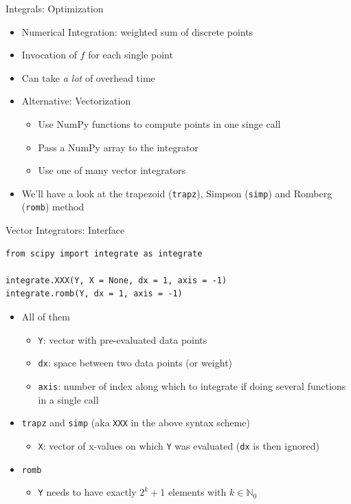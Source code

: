 
\begin{frame}{Integrals: Optimization}
%
\begin{itemize}
\item Numerical Integration: weighted sum of discrete points
\item Invocation of $f$ for each single point
\item Can take \emph{a lot} of overhead time
\item Alternative: Vectorization
	\begin{itemize}
	\item Use NumPy functions to compute points in one singe call
	\item Pass a NumPy array to the integrator
	\item Use one of many vector integrators
	\end{itemize}
\item We'll have a look at the trapezoid (\texttt{trapz}), Simpson (\texttt{simp}) and Romberg (\texttt{romb}) method
\end{itemize}
%
\end{frame}


\begin{frame}[fragile]{Vector Integrators: Interface}
%
\begin{codebox}
\begin{verbatim}
from scipy import integrate as integrate

integrate.XXX(Y, X = None, dx = 1, axis = -1)
integrate.romb(Y, dx = 1, axis = -1)
\end{verbatim}
\end{codebox}
%
\begin{itemize}
\item All of them
	\begin{itemize}
	\item \texttt{Y}: vector with pre-evaluated data points
	\item \texttt{dx}: space between two data points (or weight)
	\item \texttt{axis}: number of index along which to integrate if doing several functions in a single call
	\end{itemize}
\item \texttt{trapz} and \texttt{simp} (aka \texttt{XXX} in the above syntax scheme)
	\begin{itemize}
	\item \texttt{X}: vector of x-values on which \texttt{Y} was evaluated (\texttt{dx} is then ignored)
	\end{itemize}
\item \texttt{romb}
	\begin{itemize}
	\item \texttt{Y} needs to have exactly $2^k + 1$ elements with $k \in \mathbb{N}_0$
	\end{itemize}
\end{itemize}
%
\end{frame}

